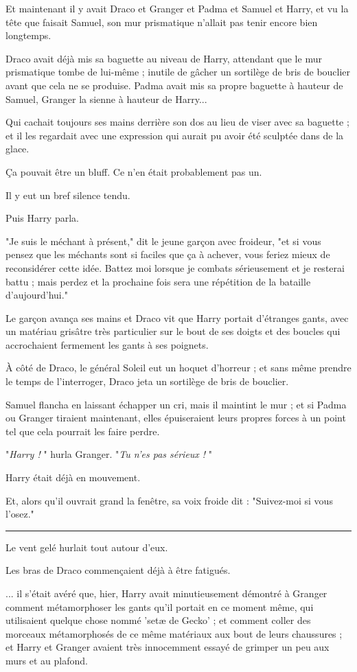 Et maintenant il y avait Draco et Granger et Padma et Samuel et Harry, et vu la tête que faisait Samuel, son mur prismatique n'allait pas tenir encore bien longtemps.

Draco avait déjà mis sa baguette au niveau de Harry, attendant que le mur prismatique tombe de lui-même ; inutile de gâcher un sortilège de bris de bouclier avant que cela ne se produise. Padma avait mis sa propre baguette à hauteur de Samuel, Granger la sienne à hauteur de Harry...

Qui cachait toujours ses mains derrière son dos au lieu de viser avec sa baguette ; et il les regardait avec une expression qui aurait pu avoir été sculptée dans de la glace.

Ça pouvait être un bluff. Ce n'en était probablement pas un.

Il y eut un bref silence tendu.

Puis Harry parla.

"Je suis le méchant à présent," dit le jeune garçon avec froideur, "et si vous pensez que les méchants sont si faciles que ça à achever, vous feriez mieux de reconsidérer cette idée. Battez moi lorsque je combats sérieusement et je resterai battu ; mais perdez et la prochaine fois sera une répétition de la bataille d'aujourd'hui."

Le garçon avança ses mains et Draco vit que Harry portait d'étranges gants, avec un matériau grisâtre très particulier sur le bout de ses doigts et des boucles qui accrochaient fermement les gants à ses poignets.

À côté de Draco, le général Soleil eut un hoquet d'horreur ; et sans même prendre le temps de l'interroger, Draco jeta un sortilège de bris de bouclier.

Samuel flancha en laissant échapper un cri, mais il maintint le mur ; et si Padma ou Granger tiraient maintenant, elles épuiseraient leurs propres forces à un point tel que cela pourrait les faire perdre.

"\emph{Harry !} " hurla Granger. "\emph{Tu n'es pas sérieux !} "

Harry était déjà en mouvement.

Et, alors qu'il ouvrait grand la fenêtre, sa voix froide dit : "Suivez-moi si vous l'osez."
\par\noindent\rule{\textwidth}{0.4pt}
Le vent gelé hurlait tout autour d'eux.

Les bras de Draco commençaient déjà à être fatigués.

... il s'était avéré que, hier, Harry avait minutieusement démontré à Granger comment métamorphoser les gants qu'il portait en ce moment même, qui utilisaient quelque chose nommé 'setæ de Gecko' ; et comment coller des morceaux métamorphosés de ce même matériaux aux bout de leurs chaussures ; et Harry et Granger avaient très innocemment essayé de grimper un peu aux murs et au plafond.

